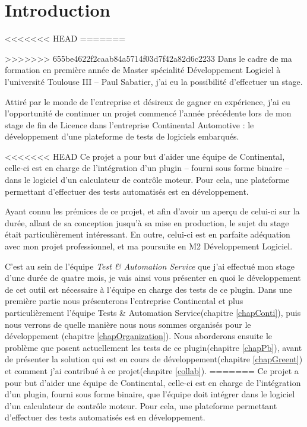 \chapter*{Introduction}

<<<<<<< HEAD
=======

>>>>>>> 655be4622f2caab84a5714f03d7f42a82d6c2233
Dans le cadre de ma formation en première année de Master spécialité Développement Logiciel à l'université Toulouse III – Paul Sabatier, j'ai eu la possibilité d'effectuer un stage.


Attiré par le monde de l'entreprise et désireux de gagner en expérience, j'ai eu l'opportunité de continuer un projet commencé l'année précédente lors de mon stage de fin de Licence dans l'entreprise Continental Automotive : le développement d'une plateforme de tests de logiciels embarqués.

<<<<<<< HEAD
Ce projet a pour but d'aider une équipe de Continental, celle-ci est en charge de l'intégration d'un plugin -- fourni sous forme binaire -- dans le logiciel d'un calculateur de contrôle moteur. Pour cela, une plateforme permettant d'effectuer des tests automatisés est en développement.

Ayant connu les prémices de ce projet, et afin d'avoir un aperçu de celui-ci sur la durée, allant de sa conception jusqu'à sa mise en production, le sujet du stage était particulièrement intéressant. En outre, celui-ci est en parfaite adéquation avec mon projet professionnel, et ma poursuite en M2 Développement Logiciel.

C'est au sein de l'équipe \textit{Test \& Automation Service} que j'ai effectué mon stage d'une durée de quatre mois, je vais ainsi vous présenter en quoi le développement de cet outil est nécessaire à l'équipe en charge des tests de ce plugin. Dans une première partie nous présenterons l'entreprise Continental et plus particulièrement l'équipe Tests \& Automation Service(chapitre \ref{chapConti}), puis nous verrons de quelle manière nous nous sommes organisés pour le développement (chapitre \ref{chapOrganization}). Nous aborderons ensuite le problème que posent actuellement les tests de ce plugin(chapitre \ref{chapPb}), avant de présenter la solution qui est en cours de développement(chapitre \ref{chapGreent}) et comment j'ai contribué à ce projet(chapitre \ref{collab}). 
=======
Ce projet a pour but d'aider une équipe de Continental, celle-ci est en charge de l'intégration d'un plugin, fourni sous forme binaire, que l'équipe doit intégrer dans le logiciel d'un calculateur de contrôle moteur. Pour cela, une plateforme permettant d'effectuer des tests automatisés est en développement.

